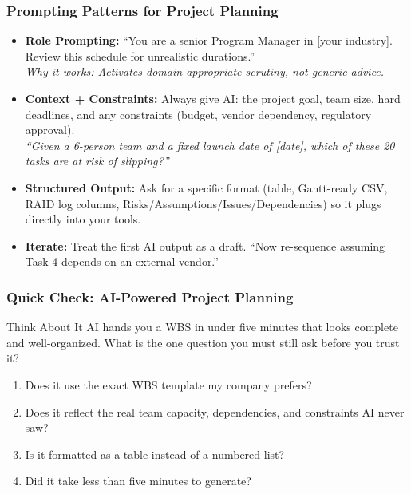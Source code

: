 \begin{frame}[fragile]\frametitle{Prompting Patterns for Project Planning}

\begin{itemize}
  \item \textbf{Role Prompting:} ``You are a senior Program Manager in [your industry]. Review this schedule for unrealistic durations.''\\
    \textit{Why it works: Activates domain-appropriate scrutiny, not generic advice.}

  \item \textbf{Context + Constraints:} Always give AI: the project goal, team size, hard deadlines, and any constraints (budget, vendor dependency, regulatory approval).\\
    \textit{``Given a 6-person team and a fixed launch date of [date], which of these 20 tasks are at risk of slipping?''}

  \item \textbf{Structured Output:} Ask for a specific format (table, Gantt-ready CSV, RAID log columns, Risks/Assumptions/Issues/Dependencies) so it plugs directly into your tools.

  \item \textbf{Iterate:} Treat the first AI output as a draft. ``Now re-sequence assuming Task 4 depends on an external vendor.''
\end{itemize}

\end{frame}

\begin{frame}[fragile]\frametitle{Quick Check: AI-Powered Project Planning}
\begin{block}{Think About It}
AI hands you a WBS in under five minutes that looks complete and well-organized. What is the one question you must still ask before you trust it?
\begin{enumerate}
  \item[A.] Does it use the exact WBS template my company prefers?
  \item[B.] Does it reflect the real team capacity, dependencies, and constraints AI never saw?
  \item[C.] Is it formatted as a table instead of a numbered list?
  \item[D.] Did it take less than five minutes to generate?
\end{enumerate}
\end{block}
\end{frame}

